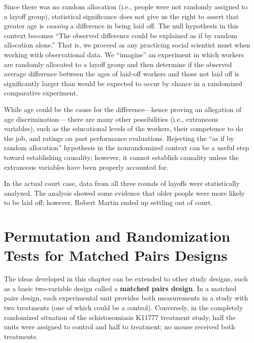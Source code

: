 \documentclass[
]{book}
\begin{document}
Since there was no random allocation (i.e., people were not randomly assigned to a layoff group), statistical significance does not give us the right to assert that greater age is \emph{causing} a difference in being laid off. The null hypothesis in this context becomes ``The observed difference could be explained as if by random allocation alone.'' That is, we proceed as any practicing social scientist must when working with observational data. We ``imagine'' an experiment in which workers are randomly allocated to a layoff group and then determine if the observed average difference between the ages of laid-off workers and those not laid off is significantly larger than would be expected to occur by chance in a randomized comparative experiment.

While age could be the cause for the difference---hence proving an allegation of age discrimination--- there are many other possibilities (i.e., extraneous variables), such as the educational levels of the workers, their competence to do the job, and ratings on past performance evaluations. Rejecting the ``as if by random allocation'' hypothesis in the nonrandomized context can be a useful step toward establishing causality; however, it cannot establish causality unless the extraneous variables have been properly accounted for.

In the actual court case, data from all three rounds of layoffs were statistically analyzed. The analysis showed some evidence that older people were more likely to be laid off; however, Robert Martin ended up settling out of court.

\hypertarget{permutation-and-randomization-tests-for-matched-pairs-designs}{%
\section{Permutation and Randomization Tests for Matched Pairs Designs}\label{permutation-and-randomization-tests-for-matched-pairs-designs}}

The ideas developed in this chapter can be extended to other study designs, such as a basic two-variable design called a \textbf{matched pairs design}. In a matched pairs design, each experimental unit provides both measurements in a study with two treatments (one of which could be a control). Conversely, in the completely randomized situation of the schistosomiasis K11777 treatment study, half the units were assigned to control and half to treatment; no mouse received both treatments.
\end{document}
